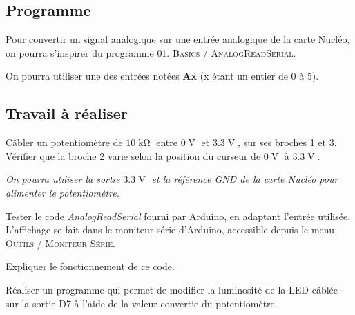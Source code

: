 \documentclass[a4paper,11pt,titlepage]{article} %
\begin{document}
\subsection{Programme}

Pour convertir un signal analogique sur une entrée analogique de la carte Nucléo, on pourra s'inspirer du programme \textsc{01. Basics / AnalogReadSerial}.

On pourra utiliser une des entrées notées \textbf{Ax} (x étant un entier de 0 à 5).


\subsection{Travail à réaliser}

\Manip Câbler un potentiomètre de $10\operatorname{k\Omega}$ entre $0\operatorname{V}$ et $3.3\operatorname{V}$, sur ses broches 1 et 3. Vérifier que la broche 2 varie selon la position du curseur de $0\operatorname{V}$ à $3.3\operatorname{V}$.

\textit{On pourra utiliser la sortie $3.3\operatorname{V}$ et la référence \textit{GND} de la carte Nucléo pour alimenter le potentiomètre.}

\Manip Tester le code \textsl{AnalogReadSerial} fourni par Arduino, en adaptant l'entrée utilisée. L'affichage se fait dans le moniteur série d'Arduino, accessible depuis le menu \textsc{Outils / Moniteur Série}.

\Quest Expliquer le fonctionnement de ce code.

\Manip Réaliser un programme qui permet de modifier la luminosité de la LED câblée sur la sortie D7 à l'aide de la valeur convertie du potentiomètre.


\newpage

\end{document}
